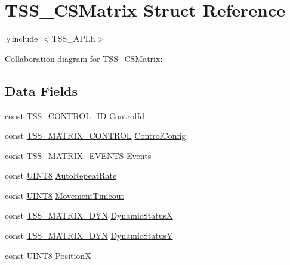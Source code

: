 \hypertarget{struct_t_s_s___c_s_matrix}{}\section{T\+S\+S\+\_\+\+C\+S\+Matrix Struct Reference}
\label{struct_t_s_s___c_s_matrix}


{\ttfamily \#include $<$T\+S\+S\+\_\+\+A\+P\+I.\+h$>$}



Collaboration diagram for T\+S\+S\+\_\+\+C\+S\+Matrix\+:
\subsection*{Data Fields}
\begin{DoxyCompactItemize}
\item 
const \hyperlink{struct_t_s_s___c_o_n_t_r_o_l___i_d}{T\+S\+S\+\_\+\+C\+O\+N\+T\+R\+O\+L\+\_\+\+ID} \hyperlink{struct_t_s_s___c_s_matrix_afcbd53ab3bcf97cfd8d0a8b45863e11a}{Control\+Id}
\item 
const \hyperlink{struct_t_s_s___m_a_t_r_i_x___c_o_n_t_r_o_l}{T\+S\+S\+\_\+\+M\+A\+T\+R\+I\+X\+\_\+\+C\+O\+N\+T\+R\+OL} \hyperlink{struct_t_s_s___c_s_matrix_a71bf021551de0ab7006791a812224377}{Control\+Config}
\item 
const \hyperlink{struct_t_s_s___m_a_t_r_i_x___e_v_e_n_t_s}{T\+S\+S\+\_\+\+M\+A\+T\+R\+I\+X\+\_\+\+E\+V\+E\+N\+TS} \hyperlink{struct_t_s_s___c_s_matrix_a5a5eb70c683591cd97cdc89c18c55f50}{Events}
\item 
const \hyperlink{_t_s_s___data_types_8h_ab27e9918b538ce9d8ca692479b375b6a}{U\+I\+N\+T8} \hyperlink{struct_t_s_s___c_s_matrix_aef1117c410a59acb56f45d9674e0dd56}{Auto\+Repeat\+Rate}
\item 
const \hyperlink{_t_s_s___data_types_8h_ab27e9918b538ce9d8ca692479b375b6a}{U\+I\+N\+T8} \hyperlink{struct_t_s_s___c_s_matrix_ad3e98b5d97454837cd6293b7abffbe9f}{Movement\+Timeout}
\item 
const \hyperlink{struct_t_s_s___m_a_t_r_i_x___d_y_n}{T\+S\+S\+\_\+\+M\+A\+T\+R\+I\+X\+\_\+\+D\+YN} \hyperlink{struct_t_s_s___c_s_matrix_a1fbf68fdd9d5e402f8fb11f6fda0060c}{Dynamic\+StatusX}
\item 
const \hyperlink{struct_t_s_s___m_a_t_r_i_x___d_y_n}{T\+S\+S\+\_\+\+M\+A\+T\+R\+I\+X\+\_\+\+D\+YN} \hyperlink{struct_t_s_s___c_s_matrix_a0243353192bc85e633a7db18d62cef29}{Dynamic\+StatusY}
\item 
const \hyperlink{_t_s_s___data_types_8h_ab27e9918b538ce9d8ca692479b375b6a}{U\+I\+N\+T8} \hyperlink{struct_t_s_s___c_s_matrix_a443602266391052b0513857132766842}{PositionX}

\end{DoxyCompactItemize}
